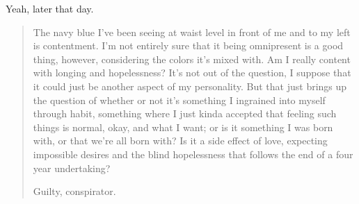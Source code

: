 \begin{paracol}{2}
\begin{leftcolumn}

Yeah, later that day.

\begin{quotation}
The navy blue I've been seeing at waist level in front of me and to my left is contentment.  I'm not entirely sure that it being omnipresent is a good thing, however, considering the colors it's mixed with.  Am I really content with longing and hopelessness?  It's not out of the question, I suppose that it could just be another aspect of my personality.  But that just brings up the question of whether or not it's something I ingrained into myself through habit, something where I just kinda accepted that feeling such things is normal, okay, and what I want; or is it something I was born with, or that we're all born with?  Is it a side effect of love, expecting impossible desires and the blind hopelessness that follows the end of a four year undertaking?


Guilty, conspirator.
\end{quotation}



\end{leftcolumn}
\end{paracol}
